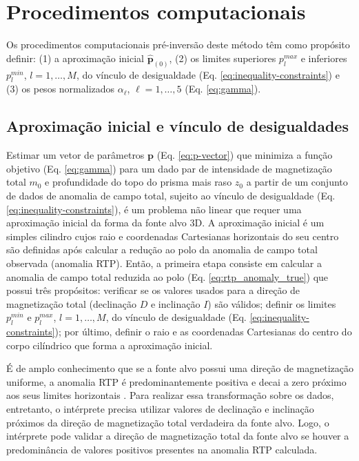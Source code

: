 \chapter{Procedimentos computacionais}

Os procedimentos computacionais pré-inversão deste método têm como propósito definir: (1) a aproximação inicial $ \hat{\mathbf{p}}_{(0)} $, (2) os limites superiores $ p_l^{max} $ e inferiores $ p_l^{min} $, $ l=1, \dots, M $, do vínculo de desigualdade (Eq. \ref{eq:inequality-constraints}) e (3) os pesos normalizados $ \alpha_{\ell} $, $ \ell=1,\dots,5 $ (Eq. \ref{eq:gamma}). 

\section{Aproximação inicial e vínculo de desigualdades}

Estimar um vetor de parâmetros $\mathbf{p}$ (Eq. \ref{eq:p-vector}) que minimiza a função objetivo (Eq. \ref{eq:gamma}) para um dado par de intensidade de magnetização total $ m_0 $ e profundidade do topo do prisma mais raso $ z_0 $ a partir de um conjunto de dados de anomalia de campo total, sujeito ao vínculo de desigualdade (Eq. \ref{eq:inequality-constraints}), é um problema não linear que requer uma aproximação inicial da forma da fonte alvo 3D. 
A aproximação inicial é um simples cilindro cujos raio e coordenadas Cartesianas horizontais do seu centro são definidas após calcular a redução ao polo da anomalia de campo total observada (anomalia RTP).
Então, a primeira etapa consiste em calcular a anomalia de campo total reduzida ao polo (Eq. \ref{eq:rtp_anomaly_true}) que possui três propósitos: verificar se os valores usados para a direção de magnetização total (declinação $D$ e inclinação $I$) são válidos; definir os limites $p_{l}^{min}$ e $p_{l}^{max}$, $ l=1, \dots, M $, do vínculo de desigualdade (Eq. \ref{eq:inequality-constraints}); por último, definir o raio e as coordenadas Cartesianas do centro do corpo cilíndrico que forma a aproximação inicial.

É de amplo conhecimento que se a fonte alvo possui uma direção de magnetização uniforme, a anomalia RTP é predominantemente positiva e decai a zero próximo aos seus limites horizontais \cite[por exemplo,][p. 331]{blakely1996}.
Para realizar essa transformação sobre os dados, entretanto, o intérprete precisa utilizar valores de declinação e inclinação próximos da direção de magnetização total verdadeira da fonte alvo.
Logo, o intérprete pode validar a direção de magnetização total da fonte alvo se houver a predominância de valores positivos presentes na anomalia RTP calculada.

